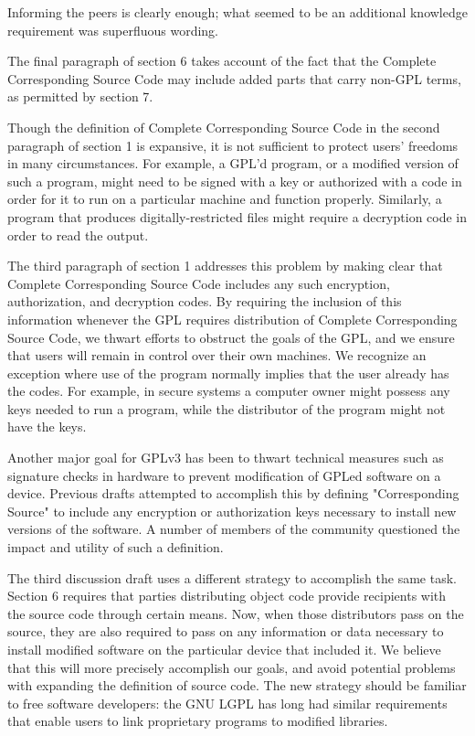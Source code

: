 Informing the peers is clearly enough; what seemed to be an additional
knowledge requirement was superfluous wording.


The final paragraph of section 6 takes account of the fact that the Complete
Corresponding Source Code may include added parts that carry non-GPL terms,
as permitted by section 7.


Though the definition of Complete Corresponding Source Code in the second
paragraph of section 1 is expansive, it is not sufficient to protect users'
freedoms in many circumstances. For example, a GPL'd program, or a modified
version of such a program, might need to be signed with a key or authorized
with a code in order for it to run on a particular machine and function
properly. Similarly, a program that produces digitally-restricted files might
require a decryption code in order to read the output.

The third paragraph of section 1 addresses this problem by making clear that
Complete Corresponding Source Code includes any such encryption,
authorization, and decryption codes. By requiring the inclusion of this
information whenever the GPL requires distribution of Complete Corresponding
Source Code, we thwart efforts to obstruct the goals of the GPL, and we
ensure that users will remain in control over their own machines. We
recognize an exception where use of the program normally implies that the
user already has the codes. For example, in secure systems a computer owner
might possess any keys needed to run a program, while the distributor of the
program might not have the keys.




Another major goal for GPLv3 has been to thwart technical measures such as
signature checks in hardware to prevent modification of GPLed software on a
device.  Previous drafts attempted to accomplish this by defining
"Corresponding Source" to include any encryption or authorization keys
necessary to install new versions of the software.  A number of members of
the community questioned the impact and utility of such a definition.

The third discussion draft uses a different strategy to accomplish the same
task.  Section 6 requires that parties distributing object code provide
recipients with the source code through certain means.  Now, when those
distributors pass on the source, they are also required to pass on any
information or data necessary to install modified software on the
particular device that included it.  We believe that this will more
precisely accomplish our goals, and avoid potential problems with expanding
the definition of source code.  The new strategy should be familiar to free
software developers: the GNU LGPL has long had similar requirements that
enable users to link proprietary programs to modified libraries.

